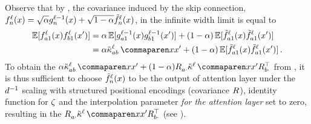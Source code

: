 Observe that by \citep{garriga2019deep,yang2019v2}, the covariance induced by the skip connection, ${f}^{\ell}_{n}{(x)} = \sqrt{\alpha} {g}^{\ell - 1}_{n}{(x)} + \sqrt{1 - \alpha} {\tilde{f}}^{\ell}_{n}{(x)}$, in the infinite width limit is equal to 
\begin{align*}
    \E [
        \indexedActivation{\depthSymbol}{\fIndexA 1}{\inputSymbol}
        \indexedActivation{\depthSymbol}{\fIndexB 1}{\inputSymbol'}
    ]
    &=
    \interpKernCoeff
    \E [
        \indexedActivity{\depthSymbol - 1}{\fIndexA 1}{\inputSymbol}
        \indexedActivity{\depthSymbol - 1}{\fIndexB 1}{\inputSymbol'}
    ]
    +
    (1 - \interpKernCoeff)
    \E [
        \tildeActivation{\depthSymbol}{\fIndexA 1}{\inputSymbol}
        \tildeActivation{\depthSymbol}{\fIndexA 1}{\inputSymbol'}
    ]
    \\
    &=
    \interpKernCoeff
    \kerntildef{\fIndexA \fIndexB}{\depthSymbol}{\inputSymbol}{\inputSymbol'}
    +
    (1 - \interpKernCoeff)
    \E [
        \tildeActivation{\depthSymbol}{\fIndexA 1}{\inputSymbol}
        \tildeActivation{\depthSymbol}{\fIndexA 1}{\inputSymbol'}
    ]
    \, .
\end{align*}
To obtain the 
$
    \interpKernCoeff \kerntildef{\fIndexA \fIndexB}{\depthSymbol}{\inputSymbol}{\inputSymbol'}
    +
    (1 - \interpKernCoeff)
    \covPosEmb{\fIndexA \cdot}{}
    \kerntildef{}{\depthSymbol}{\inputSymbol}{\inputSymbol'}
    \covPosEmb{\fIndexB \cdot}{\top}
$
from , it is thus sufficient to choose ${\tilde{f}}^{\ell}_{n}{(x)}$ to be the output of attention layer under the $d^{-1}$ scaling with structured positional encodings (covariance $R_{}^{}$), identity function for $\zeta$ and the interpolation parameter \emph{for the attention layer} set to zero, resulting in the 
$    
    \covPosEmb{\fIndexA \cdot}{}
    \kerntildef{}{\depthSymbol}{\inputSymbol}{\inputSymbol'}
    \covPosEmb{\fIndexB \cdot}{\top}
$ (see ).


